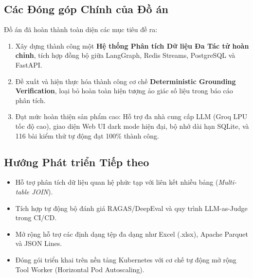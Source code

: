 \documentclass[12pt, a4paper]{article}
\begin{document}
\subsection{Các Đóng góp Chính của Đồ án}
Đồ án đã hoàn thành toàn diện các mục tiêu đề ra:
\begin{enumerate}
    \item Xây dựng thành công một \textbf{Hệ thống Phân tích Dữ liệu Đa Tác tử hoàn chỉnh}, tích hợp đồng bộ giữa LangGraph, Redis Streams, PostgreSQL và FastAPI.
    \item Đề xuất và hiện thực hóa thành công cơ chế \textbf{Deterministic Grounding Verification}, loại bỏ hoàn toàn hiện tượng ảo giác số liệu trong báo cáo phân tích.
    \item Đạt mức hoàn thiện sản phẩm cao: Hỗ trợ đa nhà cung cấp LLM (Groq LPU tốc độ cao), giao diện Web UI dark mode hiện đại, bộ nhớ dài hạn SQLite, và 116 bài kiểm thử tự động đạt 100\% thành công.
\end{enumerate}

\subsection{Hướng Phát triển Tiếp theo}
\begin{itemize}
    \item Hỗ trợ phân tích dữ liệu quan hệ phức tạp với liên kết nhiều bảng (\textit{Multi-table JOIN}).
    \item Tích hợp tự động bộ đánh giá RAGAS/DeepEval và quy trình LLM-as-Judge trong CI/CD.
    \item Mở rộng hỗ trợ các định dạng tệp đa dạng như Excel (.xlsx), Apache Parquet và JSON Lines.
    \item Đóng gói triển khai trên nền tảng Kubernetes với cơ chế tự động mở rộng Tool Worker (Horizontal Pod Autoscaling).
\end{itemize}
\end{document}
